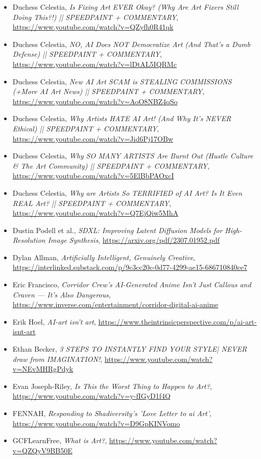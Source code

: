 \documentclass[11pt]{article}
\begin{document}
\begin{itemize}
\item Duchess Celestia, \emph{Is Fixing Art EVER Okay? (Why Are Art Fixers Still Doing This?!) || SPEEDPAINT + COMMENTARY}, \url{https://www.youtube.com/watch?v=QZyfh0R41qk}
\item Duchess Celestia, \emph{NO, AI Does NOT Democratize Art (And That's a Dumb Defense) || SPEEDPAINT + COMMENTARY}, \url{https://www.youtube.com/watch?v=lDtAL5IQRMc}
\item Duchess Celestia, \emph{New AI Art SCAM is STEALING COMMISSIONS (+More AI Art News) || SPEEDPAINT + COMMENTARY}, \url{https://www.youtube.com/watch?v=AoO8NBZ4qSo}
\item Duchess Celestia, \emph{Why Artists HATE AI Art! (And Why It’s NEVER Ethical) || SPEEDPAINT + COMMENTARY}, \url{https://www.youtube.com/watch?v=Jid6Pj17OBw}
\item Duchess Celestia, \emph{Why SO MANY ARTISTS Are Burnt Out (Hustle Culture \& The Art Community) || SPEEDPAINT + COMMENTARY}, \url{https://www.youtube.com/watch?v=5ElBbPAOxcI}
\item Duchess Celestia, \emph{Why are Artists So TERRIFIED of AI Art? Is It Even REAL Art? || SPEEDPAINT + COMMENTARY}, \url{https://www.youtube.com/watch?v=Q7EjQiw5MhA}
\item Dustin Podell et al., \emph{SDXL: Improving Latent Diffusion Models for High-Resolution Image Synthesis}, \url{https://arxiv.org/pdf/2307.01952.pdf}
\item Dylan Allman, \emph{Artificially Intelligent, Genuinely Creative}, \url{https://interlinked.substack.com/p/9c3cc20c-0d77-4299-ae15-686710840ce7}
\item Eric Francisco, \emph{Corridor Crew's AI-Generated Anime Isn't Just Callous and Craven --- It's Also Dangerous}, \url{https://www.inverse.com/entertainment/corridor-digital-ai-anime}
\item Erik Hoel, \emph{AI-art isn't art}, \url{https://www.theintrinsicperspective.com/p/ai-art-isnt-art}
\item Ethan Becker, \emph{3 STEPS TO INSTANTLY FIND YOUR STYLE| NEVER draw from IMAGINATION!}, \url{https://www.youtube.com/watch?v=NEvMHRgPdyk}
\item Evan Joseph-Riley, \emph{Is This the Worst Thing to Happen to Art?}, \url{https://www.youtube.com/watch?v=y-fIGyD1f4Q}
\item FENNAH, \emph{Responding to Shadiversity's 'Love Letter to ai Art'}, \url{https://www.youtube.com/watch?v=D9GpKINVomo}
\item GCFLearnFree, \emph{What is Art?}, \url{https://www.youtube.com/watch?v=QZQyV9BB50E}

\end{itemize}
\end{document}
